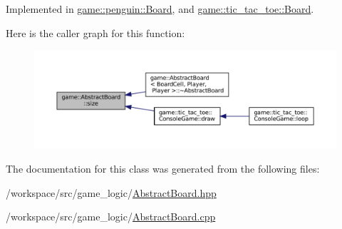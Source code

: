 Implemented in \hyperlink{classgame_1_1penguin_1_1_board_a7636e3bdb2da72d2a6395b1a2d846394}{game\+::penguin\+::\+Board}, and \hyperlink{classgame_1_1tic__tac__toe_1_1_board_ac9d2d5da2263bb6166f93eec382380db}{game\+::tic\+\_\+tac\+\_\+toe\+::\+Board}.

Here is the caller graph for this function\+:
\nopagebreak
\begin{figure}[H]
\begin{center}
\leavevmode
\includegraphics[width=350pt]{classgame_1_1_abstract_board_a17bd6905ded76d0005437d288fe8ac21_icgraph}
\end{center}
\end{figure}


The documentation for this class was generated from the following files\+:\begin{DoxyCompactItemize}
\item 
/workspace/src/game\+\_\+logic/\hyperlink{_abstract_board_8hpp}{Abstract\+Board.\+hpp}\item 
/workspace/src/game\+\_\+logic/\hyperlink{_abstract_board_8cpp}{Abstract\+Board.\+cpp}\end{DoxyCompactItemize}
